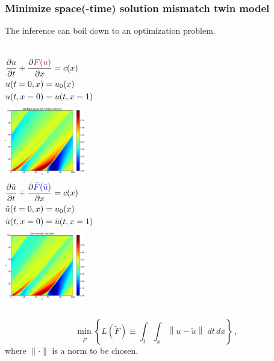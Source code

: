 \documentclass{beamer}
\begin{document}
\begin{frame}
    \frametitle{Minimize space(-time) solution mismatch \hfill \scriptsize{twin model}}\small
    The inference can boil down to an optimization problem.
    \begin{columns}
        \begin{equation*}\begin{split}
            &\frac{\partial u}{\partial t}+ \frac{\partial \textcolor{darkred}{F(u)}}{\partial x} = c(x)\\
            &u(t=0,x) = u_0(x)\\
            &u(t,x=0) = u(t, x=1)
        \end{split}\end{equation*}
        \centering
        \includegraphics[width=3.5cm]{leftcol.png} 
        \begin{equation*}\begin{split}
            &\frac{\partial \tilde{u}}{\partial t}+ \frac{\partial {\textcolor{blue}{\tilde{F}
             (\tilde{u})}}}{\partial x} = c(x)\\
            &\tilde{u}(t=0,x) = u_0(x)\\
            &\tilde{u}(t,x=0) = \tilde{u}(t, x=1)
        \end{split}\end{equation*}
        \centering
        \includegraphics[width=3.5cm]{rightcol.png}
    \end{columns}
    \begin{center}
    $$
        \min_{\tilde{F}}\left\{ L(\tilde{F}) \equiv \int_t\int_x \left\|u-\tilde{u}\right\|\; dt\,dx\right\}\,,
    $$
    \scriptsize
    where $\|\cdot\|$ is a norm to be chosen.
    \end{center}
\end{frame}
\end{document}
